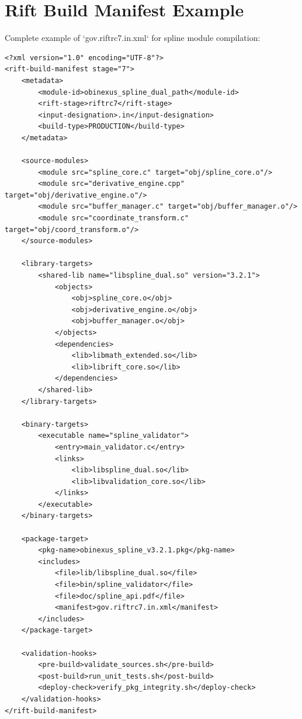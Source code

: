\documentclass[11pt,a4paper]{article}
\theoremstyle{definition}
\theoremstyle{plain}
\begin{document}
\section{Rift Build Manifest Example}

Complete example of `gov.riftrc7.in.xml` for spline module compilation:

\begin{verbatim}
<?xml version="1.0" encoding="UTF-8"?>
<rift-build-manifest stage="7">
    <metadata>
        <module-id>obinexus_spline_dual_path</module-id>
        <rift-stage>riftrc7</rift-stage>
        <input-designation>.in</input-designation>
        <build-type>PRODUCTION</build-type>
    </metadata>
    
    <source-modules>
        <module src="spline_core.c" target="obj/spline_core.o"/>
        <module src="derivative_engine.cpp" target="obj/derivative_engine.o"/>
        <module src="buffer_manager.c" target="obj/buffer_manager.o"/>
        <module src="coordinate_transform.c" target="obj/coord_transform.o"/>
    </source-modules>
    
    <library-targets>
        <shared-lib name="libspline_dual.so" version="3.2.1">
            <objects>
                <obj>spline_core.o</obj>
                <obj>derivative_engine.o</obj>
                <obj>buffer_manager.o</obj>
            </objects>
            <dependencies>
                <lib>libmath_extended.so</lib>
                <lib>librift_core.so</lib>
            </dependencies>
        </shared-lib>
    </library-targets>
    
    <binary-targets>
        <executable name="spline_validator">
            <entry>main_validator.c</entry>
            <links>
                <lib>libspline_dual.so</lib>
                <lib>libvalidation_core.so</lib>
            </links>
        </executable>
    </binary-targets>
    
    <package-target>
        <pkg-name>obinexus_spline_v3.2.1.pkg</pkg-name>
        <includes>
            <file>lib/libspline_dual.so</file>
            <file>bin/spline_validator</file>
            <file>doc/spline_api.pdf</file>
            <manifest>gov.riftrc7.in.xml</manifest>
        </includes>
    </package-target>
    
    <validation-hooks>
        <pre-build>validate_sources.sh</pre-build>
        <post-build>run_unit_tests.sh</post-build>
        <deploy-check>verify_pkg_integrity.sh</deploy-check>
    </validation-hooks>
</rift-build-manifest>
\end{verbatim}
\end{document}
